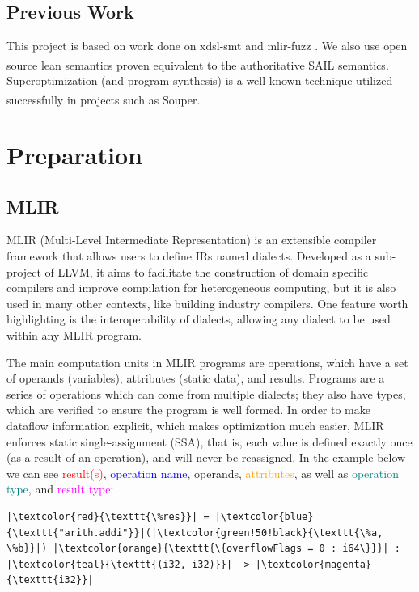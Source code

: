 \section{Previous Work}

This project is based on work done on xdsl-smt and mlir-fuzz \cite{smt-mlir}. We also use open source 
lean semantics\textsuperscript{\cite{riscv-lean}} proven equivalent to the authoritative SAIL 
semantics\textsuperscript{\cite{sail-paper}}. 
Superoptimization (and program synthesis) is a well known technique utilized successfully 
in projects such as Souper\textsuperscript{\cite{souper}}.


\clearpage
\chapter{Preparation}
\label{ch:prep}
\section{MLIR}

MLIR (Multi-Level Intermediate Representation) is an extensible compiler framework that allows
users to define IRs named dialects. Developed as a sub-project of LLVM, it aims to facilitate the 
construction of domain specific compilers and improve compilation for heterogeneous computing, 
but it is also used in many other contexts, like building industry compilers.
One feature worth highlighting is the interoperability of dialects, allowing any dialect to be
used within any MLIR program.


The main computation units in MLIR programs are operations, which have a set of operands (variables),
attributes (static data), and results. Programs are a series of operations which can come from 
multiple dialects; they also have types, which are verified to ensure the program is well formed. 
%
In order to make dataflow information explicit, which makes optimization much easier, MLIR enforces
static single-assignment (SSA), that is, each value is defined exactly once (as a result of an operation), 
and will never be reassigned.
%
In the example below we can see \textcolor{red}{result(s)}, 
\textcolor{blue}{operation name}, \textcolor{green!50!black}{operands}, \textcolor{orange}{attributes}, 
as well as \textcolor{teal}{operation type}, and \textcolor{magenta}{result type}:

\begin{verbatim}
|\textcolor{red}{\texttt{\%res}}| = |\textcolor{blue}{\texttt{"arith.addi"}}|(|\textcolor{green!50!black}{\texttt{\%a, \%b}}|) |\textcolor{orange}{\texttt{\{overflowFlags = 0 : i64\}}}| : |\textcolor{teal}{\texttt{(i32, i32)}}| -> |\textcolor{magenta}{\texttt{i32}}|
\end{verbatim}




